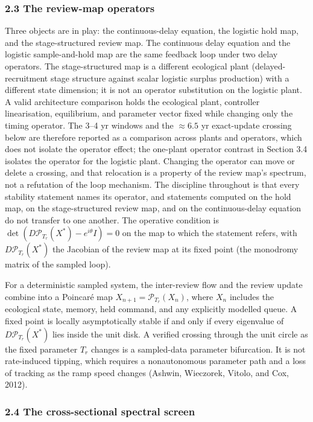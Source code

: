 \documentclass[11pt]{article}
\begin{document}
\subsubsection{2.3 The review-map
operators}\label{the-review-map-operators}

Three objects are in play: the continuous-delay equation, the logistic
hold map, and the stage-structured review map. The continuous delay
equation and the logistic sample-and-hold map are the same feedback loop
under two delay operators. The stage-structured map is a different
ecological plant (delayed-recruitment stage structure against scalar
logistic surplus production) with a different state dimension; it is not
an operator substitution on the logistic plant. A valid architecture
comparison holds the ecological plant, controller linearisation,
equilibrium, and parameter vector fixed while changing only the timing
operator. The 3--4 yr windows and the \(\approx 6.5\) yr exact-update crossing below
are therefore reported as a comparison across plants and operators, which does not isolate the operator effect; the one-plant operator contrast in Section 3.4 isolates the operator for the logistic plant. Changing the
operator can move or delete a crossing, and that relocation is a
property of the review map's spectrum, not a refutation of the loop mechanism. The
discipline throughout is that every stability statement names its
operator, and statements computed on the hold map, on the
stage-structured review map, and on the continuous-delay equation do not
transfer to one another. The operative condition is
\(\det(D\mathcal P_{T_r}(X^*)-e^{i\theta}I)=0\) on the map to which the
statement refers, with \(D\mathcal P_{T_r}(X^*)\) the Jacobian of the
review map at its fixed point (the monodromy matrix of the sampled
loop).

For a deterministic sampled system, the inter-review flow and the review
update combine into a Poincar\'e map \(X_{n+1}=\mathcal P_{T_r}(X_n)\),
where \(X_n\) includes the ecological state, memory, held command, and
any explicitly modelled queue. A fixed point is locally asymptotically
stable if and only if every eigenvalue of \(D\mathcal P_{T_r}(X^*)\)
lies inside the unit disk. A verified crossing through the unit circle
as the fixed parameter \(T_r\) changes is a sampled-data parameter
bifurcation. It is not rate-induced tipping, which requires a
nonautonomous parameter path and a loss of tracking as the ramp speed
changes (Ashwin, Wieczorek, Vitolo, and Cox, 2012).

\subsubsection{2.4 The cross-sectional spectral
screen}\label{the-cross-sectional-spectral-screen}
\end{document}
